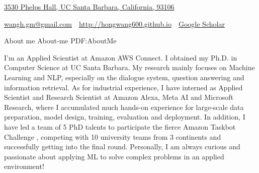 \documentclass[letterpaper,MMMyyyy,nonstopmode]{simpleresumecv}
\newcommand{\CVAuthor}{Hong Wang}
\newcommand{\CVWebpage}{http://hongwang600.github.io}
\begin{document}

\Title{\CVAuthor}

\begin{SubTitle}
\href{https://www.google.com/maps/place/Phelps+Hall/@34.4161308,-119.8468366,17z/data=!3m1!4b1!4m5!3m4!1s0x80e93f7042b51aa9:0xc80cbd08cacd9e49!8m2!3d34.4161308!4d-119.8446426}
{3530 Phelps Hall, UC Santa Barbara, California, 93106}
\par
\href{mailto:wangh.gm@gmail.com}
{wangh.gm@gmail.com}
\,\SubBulletSymbol\,
\href{\CVWebpage}
{\url{\CVWebpage}}
\,\SubBulletSymbol\,
\href{https://scholar.google.com/citations?user=M9uQHIUAAAAJ&hl=en&authuser=1#}
{Google Scholar}
\end{SubTitle}

\begin{Body}





\Section
{About me}
{About-me}
{PDF:AboutMe}

\Entry
I'm an Applied Scientist at Amazon AWS Connect. I obtained my Ph.D. in Computer Science at UC Santa Barbara. My research mainly focuses on Machine Learning and NLP, especially on the dialogue system, question answering and information retrieval. As for industrial experience, I have interned as Applied Scientist and Research Scientist at Amazon Alexa, Meta AI and Microsoft Research, where I accumulated much hands-on experience for large-scale data preparation, model design, training, evaluation and deployment. In addition, I have led a team of 5 PhD talents to participate the fierce Amazon Taskbot Challenge , competing with 10 university teams from 3 continents and successfully getting into the final round. Personally, I am always curious and passionate about applying ML to solve complex problems in an applied environment! 



\end{Body}
\end{document}
